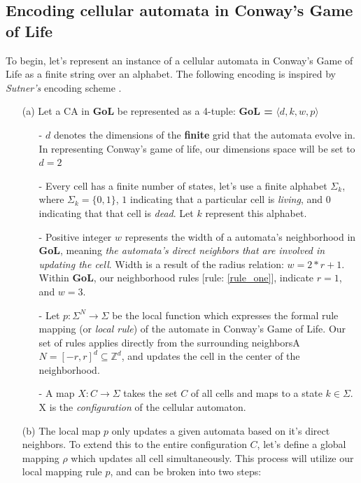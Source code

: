 \documentclass{article}
\theoremstyle{definition}
\theoremstyle{plain}
\theoremstyle{plain}
\begin{document}
\subsection{Encoding cellular automata in Conway's Game of Life}
To begin, let's represent an instance of a cellular automata in Conway's Game of Life as a finite string over an alphabet. The following encoding is inspired by \textit{Sutner's} encoding scheme \cite{SUTNER199587}.
\begin{enumerate}
  \item[(a)] Let a CA in \textbf{GoL} be represented as a 4-tuple: \textbf{GoL = } $ \langle d, k, w, p \rangle$ \label{gol}
    \begin{enumerate}
      \item[-] $d$ denotes the dimensions of the \textbf{finite} grid that the automata evolve in. In representing Conway's game of life, our dimensions space will be set to $d = 2$
      \item[-] Every cell has a finite number of states, let's use a finite alphabet $\Sigma_k$, where $\Sigma_k = \{0,1\}$, $1$ indicating that a particular cell is \textit{living}, and $0$ indicating that that cell is \textit{dead}. Let $k$ represent this alphabet.
      \item[-] Positive integer $w$ represents the width of a automata's neighborhood in \textbf{GoL}, meaning \textit{the automata's direct neighbors that are involved in updating the cell}. Width is a result of the radius relation: $w = 2*r +1$. Within \textbf{GoL}, our neighborhood rules [rule: \ref{rule_one}], indicate $r = 1$, and $w = 3$.
      \item[-] Let $p : \Sigma^N \to \Sigma$ be the local function which expresses the formal rule mapping (or \textit{local rule}) of the automate in Conway's Game of Life. Our set of rules applies directly from the surrounding neighborsA $ N = [-r, r]^d \subseteq \mathbb{Z}^d $, and updates the cell in the center of the neighborhood.
      \item[-] A map $ X : C \to \Sigma $ takes the set $ C $ of all cells and maps to a state $ k \in \Sigma$. X is the \emph{configuration} of the cellular automaton.
    \end{enumerate}
      \item[(b)] The local map $p$ only updates a given automata based on it's direct neighbors. To extend this to the entire configuration $C$, let's define a global mapping $\rho$ which updates all cell simultaneously. This process will utilize our local mapping rule $p$, and  can be broken into two steps: 

\end{enumerate}
\end{document}
